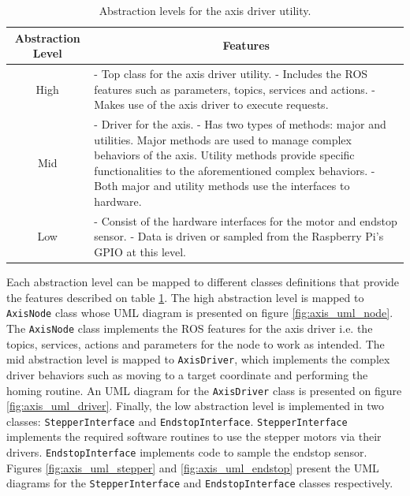 \documentclass{article}
\begin{document}
\begin{table}[H]
    \centering
    \begin{tabular}{|c|p{10cm}|}
        \hline
        \textbf{Abstraction Level} & \multicolumn{1}{c|}{\textbf{Features}} \\ \hline
        High & - Top class for the axis driver utility. \newline - Includes the ROS features such as parameters, topics, services and actions. \newline - Makes use of the axis driver to execute requests. \\ \hline
        Mid & - Driver for the axis. \newline - Has two types of methods: major and utilities. Major methods are used to manage complex behaviors of the axis. Utility methods provide specific functionalities to the aforementioned complex behaviors. \newline - Both major and utility methods use the interfaces to hardware. \\ \hline
        Low & - Consist of the hardware interfaces for the motor and endstop sensor. \newline - Data is driven or sampled from the Raspberry Pi's GPIO at this level. \\ \hline
    \end{tabular}
    \caption{Abstraction levels for the axis driver utility.}
    \label{tab:axis_abstraction}
\end{table}

Each abstraction level can be mapped to different classes definitions that provide the features described on table \ref{tab:axis_abstraction}. The high abstraction level is mapped to \texttt{AxisNode} class whose UML diagram is presented on figure \ref{fig:axis_uml_node}. The \texttt{AxisNode} class implements the ROS features for the axis driver i.e. the topics, services, actions and parameters for the node to work as intended. The mid abstraction level is mapped to \texttt{AxisDriver}, which implements the complex driver behaviors such as moving to a target coordinate and performing the homing routine. An UML diagram for the \texttt{AxisDriver} class is presented on figure \ref{fig:axis_uml_driver}. Finally, the low abstraction level is implemented in two classes: \texttt{StepperInterface} and \texttt{EndstopInterface}. \texttt{StepperInterface} implements the required software routines to use the stepper motors via their drivers. \texttt{EndstopInterface} implements code to sample the endstop sensor. Figures \ref{fig:axis_uml_stepper} and \ref{fig:axis_uml_endstop} present the UML diagrams for the \texttt{StepperInterface} and \texttt{EndstopInterface} classes respectively.
\end{document}
